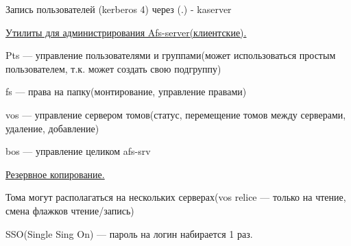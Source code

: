 Запись пользователей (kerberos 4) через (.) -
kaserver
\par 
\underline{Утилиты для администрирования
Afs-server(клиентские).}
\par 
Pts — управление пользователями и
группами(может использоваться простым
пользователем, т.к. может создать свою
подгруппу)
\par 
fs — права на папку(монтирование,
управление правами)
\par 
vos — управление сервером томов(статус,
перемещение томов между серверами,
удаление, добавление)
\par 
bos — управление целиком afs-srv
\par 
\underline{Резервное копирование.}
\par 
Тома могут располагаться на нескольких
серверах(vos relice — только на чтение, смена
флажков чтение/запись)
\par 
SSO(Single Sing On) — пароль на логин набирается
1 раз.
